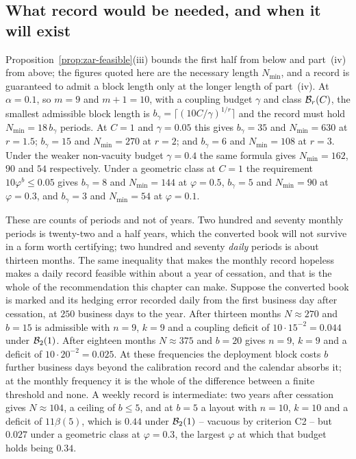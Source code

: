 \documentclass[../../../main.tex]{subfiles}
\begin{document}
\subsection{What record would be needed, and when it will exist}\label{sec:zar-frequency-need}

Proposition~\ref{prop:zar-feasible}(iii) bounds the first half from below and part~(iv) from above; the figures quoted here are the necessary length $N_{\min}$, and a record is guaranteed to admit a block length only at the longer length of part~(iv). At $\alpha=0.1$, so $m=9$ and $m+1=10$, with a coupling budget $\gamma$ and class $\mathcal B_{r}(C)$, the smallest admissible block length is $b_\gamma=\lceil(10C/\gamma)^{1/r}\rceil$ and the record must hold $N_{\min}=18\,b_\gamma$ periods. At $C=1$ and $\gamma=0.05$ this gives $b_\gamma=35$ and $N_{\min}=630$ at $r=1.5$; $b_\gamma=15$ and $N_{\min}=270$ at $r=2$; and $b_\gamma=6$ and $N_{\min}=108$ at $r=3$. Under the weaker non-vacuity budget $\gamma=0.4$ the same formula gives $N_{\min}=162$, $90$ and $54$ respectively. Under a geometric class at $C=1$ the requirement $10\varphi^{b}\le0.05$ gives $b_\gamma=8$ and $N_{\min}=144$ at $\varphi=0.5$, $b_\gamma=5$ and $N_{\min}=90$ at $\varphi=0.3$, and $b_\gamma=3$ and $N_{\min}=54$ at $\varphi=0.1$.

These are counts of periods and not of years. Two hundred and seventy monthly periods is twenty-two and a half years, which the converted book will not survive in a form worth certifying; two hundred and seventy \emph{daily} periods is about thirteen months. The same inequality that makes the monthly record hopeless makes a daily record feasible within about a year of cessation, and that is the whole of the recommendation this chapter can make. Suppose the converted book is marked and its hedging error recorded daily from the first business day after cessation, at $250$ business days to the year. After thirteen months $N\approx270$ and $b=15$ is admissible with $n=9$, $k=9$ and a coupling deficit of $10\cdot15^{-2}=0.044$ under $\mathcal B_{2}(1)$. After eighteen months $N\approx375$ and $b=20$ gives $n=9$, $k=9$ and a deficit of $10\cdot20^{-2}=0.025$. At these frequencies the deployment block costs $b$ further business days beyond the calibration record and the calendar absorbs it; at the monthly frequency it is the whole of the difference between a finite threshold and none. A weekly record is intermediate: two years after cessation gives $N\approx104$, a ceiling of $b\le5$, and at $b=5$ a layout with $n=10$, $k=10$ and a deficit of $11\beta(5)$, which is $0.44$ under $\mathcal B_{2}(1)$ -- vacuous by criterion C2 -- but $0.027$ under a geometric class at $\varphi=0.3$, the largest $\varphi$ at which that budget holds being $0.34$.
\end{document}
